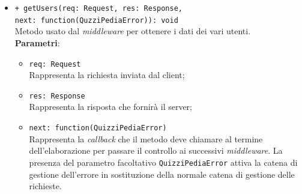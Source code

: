 \begin{itemize}
\begin{itemize}
\begin{itemize}
		 \end{itemize}
		  \item
		 	 \texttt{+ getUsers(req: Request, res: Response, \\next: function(QuzziPediaError)): void} \\
		Metodo usato dal \textit{middleware} per ottenere i dati dei vari utenti. \\
		\textbf{Parametri}:
		 \begin{itemize}
		  \item
			\texttt{req: Request} \\
			Rappresenta la richiesta inviata dal client;
		  \item
			\texttt{res: Response} \\
			Rappresenta la risposta che fornirà il server;
		  \item
		    \texttt{next: function(QuizziPediaError)} \\
			Rappresenta la \textit{callback} che il metodo deve chiamare al termine dell'elaborazione per passare il controllo ai successivi \textit{middleware}. La presenza del parametro facoltativo \texttt{QuizziPediaError} attiva la catena di gestione dell'errore in sostituzione della normale catena di gestione delle richieste.
		 \end{itemize}
	\end{itemize}	 
\end{itemize}
